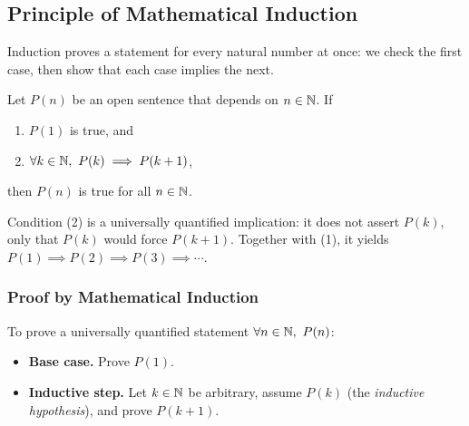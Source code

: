 \subsection{Principle of Mathematical Induction}
Induction proves a statement for every natural number at once: we check the
first case, then show that each case implies the next.

\begin{axiom}
    Let $P(n)$ be an open sentence that depends on $n \in \mathbb{N}$. If
    \begin{enumerate}[label = (\arabic*)]
        \item $P(1)$ is true, and
        \item $\forall k \in \mathbb{N},\ P(k) \implies P(k + 1)$,
    \end{enumerate}
    then $P(n)$ is true for all $n \in \mathbb{N}$.
\end{axiom}
Condition (2) is a universally quantified implication: it does not assert
$P(k)$, only that $P(k)$ would force $P(k+1)$. Together with (1), it yields
$P(1)\implies P(2)\implies P(3)\implies\cdots$.

\subsubsection{Proof by Mathematical Induction}
To prove a universally quantified statement $\forall n \in \mathbb{N},\ P(n)$:
\begin{itemize}
    \item \textbf{Base case.} Prove $P(1)$.
    \item \textbf{Inductive step.} Let $k\in\mathbb{N}$ be arbitrary, assume $P(k)$
    (the \emph{inductive hypothesis}), and prove $P(k+1)$.
\end{itemize}

